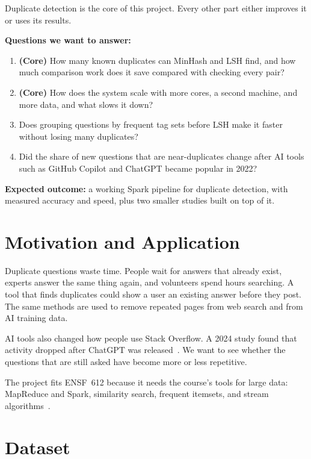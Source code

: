 \documentclass[11pt,a4paper]{article}
\begin{document}
Duplicate detection is the core of this project. Every other part either
improves it or uses its results.

\textbf{Questions we want to answer:}
\begin{enumerate}[label=\textbf{Q\arabic*.},leftmargin=2.2em]
  \item \textbf{(Core)} How many known duplicates can MinHash and LSH find, and
        how much comparison work does it save compared with checking every pair?
  \item \textbf{(Core)} How does the system scale with more cores, a second
        machine, and more data, and what slows it down?
  \item Does grouping questions by frequent tag sets before LSH make it faster
        without losing many duplicates?
  \item Did the share of new questions that are near-duplicates change after AI
        tools such as GitHub Copilot and ChatGPT became popular in 2022?
\end{enumerate}

\textbf{Expected outcome:} a working Spark pipeline for duplicate detection,
with measured accuracy and speed, plus two smaller studies built on top of it.

\section{Motivation and Application}

Duplicate questions waste time. People wait for answers that already exist,
experts answer the same thing again, and volunteers spend hours searching. A
tool that finds duplicates could show a user an existing answer before they
post. The same methods are used to remove repeated pages from web search and
from AI training data.

AI tools also changed how people use Stack Overflow. A 2024 study found that
activity dropped after ChatGPT was released~\cite{delrio2024}. We want to see
whether the questions that are still asked have become more or less repetitive.

The project fits ENSF~612 because it needs the course's tools for large data:
MapReduce and Spark, similarity search, frequent itemsets, and stream
algorithms~\cite{mmds}.

\section{Dataset}
\end{document}
